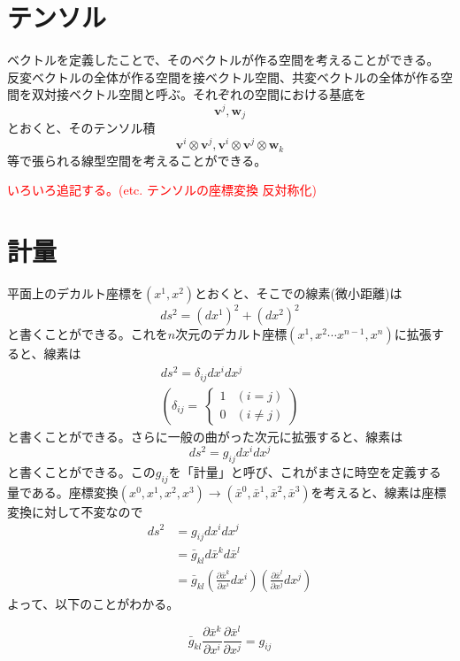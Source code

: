 \documentclass[dvipdfmx]{report} %
\begin{document}
\section{テンソル}
ベクトルを定義したことで、そのベクトルが作る空間を考えることができる。
反変ベクトルの全体が作る空間を接ベクトル空間、共変ベクトルの全体が作る空間を双対接ベクトル空間と呼ぶ。それぞれの空間における基底を
\[ \bm{v}^j, \bm{w}_j \]
とおくと、そのテンソル積
\[ \bm{v}^i \otimes \bm{v}^j, \bm{v}^i \otimes \bm{v}^j \otimes \bm{w}_k \]
等で張られる線型空間を考えることができる。

\textcolor{red}{いろいろ追記する。(etc. テンソルの座標変換 反対称化)}


\section{計量}
平面上のデカルト座標を$(x^1, x^2)$とおくと、そこでの線素(微小距離)は
\[ ds^2 = (dx^1)^2 + (dx^2)^2 \]
と書くことができる。これを$n$次元のデカルト座標$(x^1, x^2 \cdots x^{n-1}, x^n)$に拡張すると、線素は
\begin{equation*}
\begin{split}
	ds^2 = \delta_{ij} dx^i dx^j \\
	\left(
	\delta_{ij} =\
		\begin{cases}
			1 & (i=j)\\
			0 & (i \neq j)
		\end{cases}
	\right)
\end{split}
\end{equation*}
と書くことができる。さらに一般の曲がった次元に拡張すると、線素は
\[ ds^2 = g_{ij} dx^i dx^j \]
と書くことができる。この$g_{ij}$を「計量」と呼び、これがまさに時空を定義する量である。座標変換$(x^0, x^1, x^2, x^3) \rightarrow (\bar{x}^0, \bar{x}^1, \bar{x}^2, \bar{x}^3)$を考えると、線素は座標変換に対して不変なので
\begin{equation*}
\begin{split}
	ds^2 &= g_{ij} dx^i dx^j \\
	&= \bar{g}_{kl} d \bar{x}^k d \bar{x}^l\\
	&= \bar{g}_{kl} \left( \frac{\partial \bar{x}^k}{\partial x^i} dx^i \right) \left( \frac{\partial \bar{x}^l}{\partial x^j} dx^j \right)
\end{split}
\end{equation*}
よって、以下のことがわかる。
\begin{tcolorbox}[title=計量$g_{ij}$の変換則]
	\[ \bar{g}_{kl} \frac{\partial \bar{x}^k}{\partial x^i} \frac{\partial \bar{x}^l}{\partial x^j} = g_{ij} \]
\end{tcolorbox}
\end{document}
